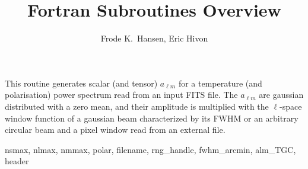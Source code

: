 
\sloppy


\title{\healpix Fortran Subroutines Overview}
 \section[create\_alm*]{ }
\label{sub:create_alm}
\author{Frode K.~Hansen, Eric Hivon}

\begin{facility}
{This routine generates scalar (and tensor) $a_{\ell m}$ for a temperature (and
  polarisation) power spectrum read from an input FITS
file. The $a_{\ell m}$ are gaussian distributed with a zero mean, and their
  amplitude is multiplied with the $\ell$-space window function of a gaussian
  beam characterized by its FWHM or an arbitrary circular beam
and a pixel window read from an external file.}
{\modAlmTools}
\end{facility}

\begin{f90format}
{nsmax, nlmax, nmmax, polar, filename, rng\_handle, fwhm\_arcmin, alm\_TGC, header }
\end{f90format}
\aboutoptional

